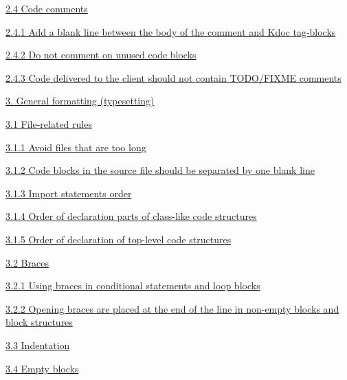 \hspace{0.5cm}\hyperref[sec:2.4]{ 2.4 Code comments}

\hspace{1.0cm}\hyperref[sec:2.4.1]{ 2.4.1 Add a blank line between the body of the comment and Kdoc tag-blocks}

\hspace{1.0cm}\hyperref[sec:2.4.2]{ 2.4.2 Do not comment on unused code blocks}

\hspace{1.0cm}\hyperref[sec:2.4.3]{ 2.4.3 Code delivered to the client should not contain TODO/FIXME comments}

\hspace{1.0cm}\hyperref[sec:]{}

\hspace{0.0cm}\hyperref[sec:3.]{3. General formatting (typesetting)}

\hspace{0.5cm}\hyperref[sec:3.1]{ 3.1 File-related rules}

\hspace{1.0cm}\hyperref[sec:3.1.1]{ 3.1.1 Avoid files that are too long}

\hspace{1.0cm}\hyperref[sec:3.1.2]{ 3.1.2 Code blocks in the source file should be separated by one blank line}

\hspace{1.0cm}\hyperref[sec:3.1.3]{ 3.1.3 Import statements order}

\hspace{1.0cm}\hyperref[sec:3.1.4]{ 3.1.4 Order of declaration parts of class-like code structures}

\hspace{1.0cm}\hyperref[sec:3.1.5]{ 3.1.5 Order of declaration of top-level code structures}

\hspace{0.5cm}\hyperref[sec:3.2]{ 3.2 Braces}

\hspace{1.0cm}\hyperref[sec:3.2.1]{ 3.2.1 Using braces in conditional statements and loop blocks}

\hspace{1.0cm}\hyperref[sec:3.2.2]{ 3.2.2 Opening braces are placed at the end of the line in non-empty blocks and block structures}

\hspace{0.5cm}\hyperref[sec:3.3]{ 3.3 Indentation}

\hspace{0.5cm}\hyperref[sec:3.4]{ 3.4 Empty blocks}

